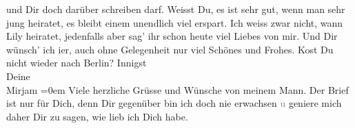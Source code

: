 \begin{ledgroupsized}[t]{13cm}
                    und Dir doch darüber schreiben darf. Weisst Du, es ist sehr gut, wenn man sehr
                    jung heiratet, es bleibt einem unendlich viel erspart. Ich weiss zwar nicht,
                    wann Lily heiratet, jedenfalls {\pb}aber sag’ ihr schon heute
                    viel Liebes von mir. Und Dir wünsch’ ich i{\geminationm}er, auch
                    ohne Gelegenheit nur viel Schönes und Frohes.\pend
           \pstart
           Ko{\geminationm}st Du nicht wieder nach Berlin?\pend
           \pstart
           Innigst{\\[\baselineskip]}Deine{\\[\baselineskip]}\spacefill\mbox{Mirjam}\pend
           \leftskip=0em{}\pstart
           \noindent{}Viele herzliche Grüsse und Wünsche von meinem Mann.\pend
           \pstart
           Der Brief ist nur für Dich, denn Dir gegenüber bin ich doch nie erwachsen \textcolor{gray}{u}
                        geniere mich daher Dir zu sagen, wie lieb ich Dich habe.\pend
           \endnumbering{}\end{ledgroupsized}  \newcommand{\dateiname}{L02488}\newcommand{\titel}{Mirjam Beer-Hofmann an Arthur Schnitzler, 8. 6. 1927}\newcommand{\editorInnen}{Martin Anton Müller und Gerd-Hermann Susen}
      